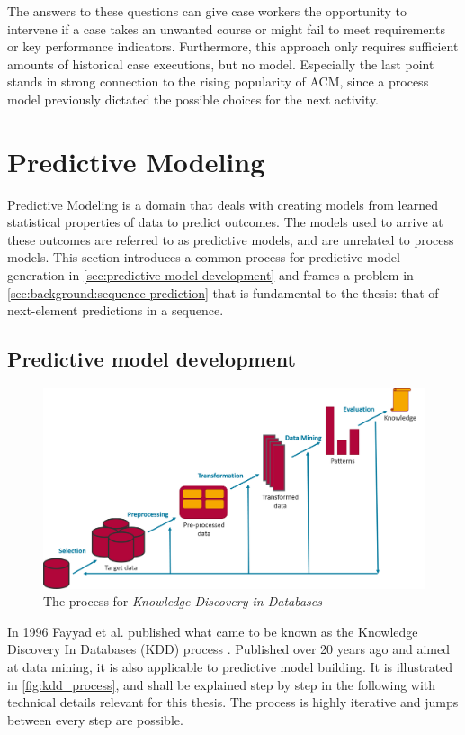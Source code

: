 The answers to these questions can give case workers the opportunity to intervene if a case takes an unwanted course or might fail to meet requirements or key performance indicators. Furthermore, this approach only requires sufficient amounts of historical case executions, but no model. Especially the last point stands in strong connection to the rising popularity of ACM, since a process model previously dictated the possible choices for the next activity.

\section{Predictive Modeling}
\label{sec:predictive-modeling}
Predictive Modeling is a domain that deals with creating models from learned statistical properties of data to predict outcomes. The models used to arrive at these outcomes are referred to as predictive models, and are unrelated to process models. This section introduces a common process for predictive model generation in \autoref{sec:predictive-model-development} and frames a problem in \autoref{sec:background:sequence-prediction} that is fundamental to the thesis: that of next-element predictions in a sequence.

\subsection{Predictive model development}
\label{sec:predictive-model-development}
\begin{figure}
	\centering
	\includegraphics[width=\textwidth]{gfx/kdd_process.png}
	\caption{The process for \textit{Knowledge Discovery in Databases}~\cite{fayyad1996data}}
	\label{fig:kdd_process}
\end{figure}

In 1996 Fayyad et al. published what came to be known as the Knowledge Discovery In Databases (KDD) process \cite{fayyad1996data}. Published over 20 years ago and aimed at data mining, it is also applicable to predictive model building. It is illustrated in \autoref{fig:kdd_process}, and shall be explained step by step in the following with technical details relevant for this thesis. The process is highly iterative and jumps between every step are possible.

